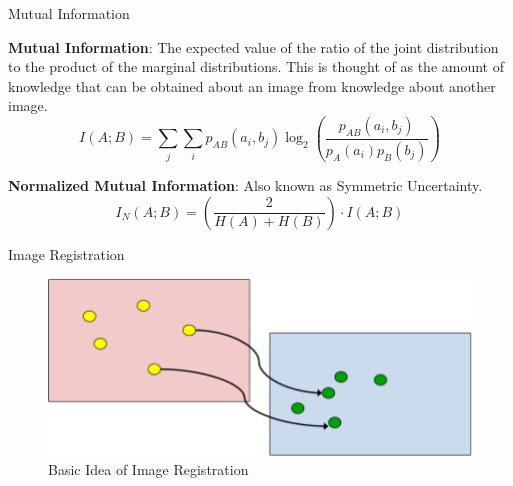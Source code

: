 \documentclass{beamer}
\begin{document}
\begin{frame}[c]{\sc Mutual Information}

\textbf{Mutual Information}: The expected value of the ratio of the joint distribution to the product of the marginal distributions. This is thought of as the amount of knowledge that can be obtained about an image from knowledge about another image.
\begin{equation}
\label{MutualInformation}
	I(A;B) = \sum_{j}{\sum_{i}{p_{AB}(a_{i},b_{j}) \log_{2}{\left( \frac{p_{AB}(a_{i},b_{j})}{p_{A}(a_{i})p_{B}(b_{j})}\right)}}}
\end{equation}

\vfill

\textbf{Normalized Mutual Information}: Also known as Symmetric Uncertainty.
\begin{equation}
\label{NormalizedMutualInformation}
	I_{N}(A;B) = \left( \frac{2}{H(A) + H(B)}\right) \cdot I(A;B)
\end{equation}

\end{frame}




\begin{frame}[c]{\sc Image Registration}

\begin{figure}
\centering
\includegraphics[width=.95\columnwidth]{imageRegistration}
\caption{Basic Idea of Image Registration}
\label{imageRegistration}
\end{figure}

\end{frame}
\end{document}
